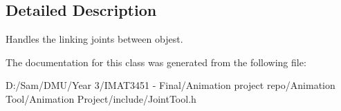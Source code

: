 \subsection{Detailed Description}
Handles the linking joints between objest. 

The documentation for this class was generated from the following file\+:\begin{DoxyCompactItemize}
\item 
D\+:/\+Sam/\+D\+M\+U/\+Year 3/\+I\+M\+A\+T3451 -\/ Final/\+Animation project repo/\+Animation Tool/\+Animation Project/include/Joint\+Tool.\+h\end{DoxyCompactItemize}
